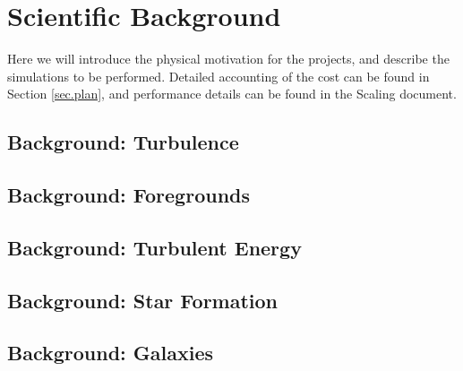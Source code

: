 \section{Scientific Background}
\label{sec.background}

Here we will introduce the physical motivation for the projects, and describe
the simulations to be performed.  Detailed accounting of the cost 
can be found in Section \ref{sec.plan}, and performance details can be found in the
Scaling document.

\subsection{Background: Turbulence}
\label{sec.turbulence}



\subsection{Background: Foregrounds}
\label{sec.back_foregrounds}



\subsection{Background: Turbulent Energy}
\label{sec.back_turb}



\subsection{Background: Star Formation}
\label{sec.back_cores}



\subsection{Background: Galaxies}
\label{sec.back_galaxies}


